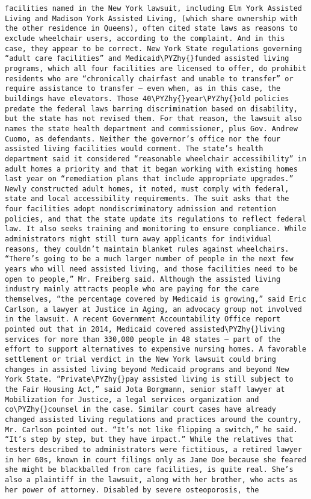 \documentclass[11pt]{article}
\def\PYZhy{\char`\-}
\begin{document}
\begin{Verbatim}[commandchars=\\\{\}]
facilities named in the New York lawsuit, including Elm York Assisted Living and Madison York Assisted Living, (which share ownership with the other residence in Queens), often cited state laws as reasons to exclude wheelchair users, according to the complaint. And in this case, they appear to be correct. New York State regulations governing “adult care facilities” and Medicaid\PYZhy{}funded assisted living programs, which all four facilities are licensed to offer, do prohibit residents who are “chronically chairfast and unable to transfer” or require assistance to transfer — even when, as in this case, the buildings have elevators. Those 40\PYZhy{}year\PYZhy{}old policies predate the federal laws barring discrimination based on disability, but the state has not revised them. For that reason, the lawsuit also names the state health department and commissioner, plus Gov. Andrew Cuomo, as defendants. Neither the governor’s office nor the four assisted living facilities would comment. The state’s health department said it considered “reasonable wheelchair accessibility” in adult homes a priority and that it began working with existing homes last year on “remediation plans that include appropriate upgrades.” Newly constructed adult homes, it noted, must comply with federal, state and local accessibility requirements. The suit asks that the four facilities adopt nondiscriminatory admission and retention policies, and that the state update its regulations to reflect federal law. It also seeks training and monitoring to ensure compliance. While administrators might still turn away applicants for individual reasons, they couldn’t maintain blanket rules against wheelchairs. “There’s going to be a much larger number of people in the next few years who will need assisted living, and those facilities need to be open to people,” Mr. Freiberg said. Although the assisted living industry mainly attracts people who are paying for the care themselves, “the percentage covered by Medicaid is growing,” said Eric Carlson, a lawyer at Justice in Aging, an advocacy group not involved in the lawsuit. A recent Government Accountability Office report pointed out that in 2014, Medicaid covered assisted\PYZhy{}living services for more than 330,000 people in 48 states — part of the effort to support alternatives to expensive nursing homes. A favorable settlement or trial verdict in the New York lawsuit could bring changes in assisted living beyond Medicaid programs and beyond New York State. “Private\PYZhy{}pay assisted living is still subject to the Fair Housing Act,” said Jota Borgmann, senior staff lawyer at Mobilization for Justice, a legal services organization and co\PYZhy{}counsel in the case. Similar court cases have already changed assisted living regulations and practices around the country, Mr. Carlson pointed out. “It’s not like flipping a switch,” he said. “It’s step by step, but they have impact.” While the relatives that testers described to administrators were fictitious, a retired lawyer in her 60s, known in court filings only as Jane Doe because she feared she might be blackballed from care facilities, is quite real. She’s also a plaintiff in the lawsuit, along with her brother, who acts as her power of attorney. Disabled by severe osteoporosis, the 
\end{Verbatim}
\end{document}
